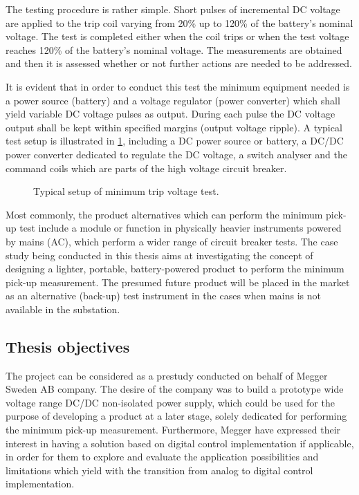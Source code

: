 The testing procedure is rather simple. Short pulses of incremental DC voltage are applied to the trip coil varying from 20\% up to 120\% of the battery's nominal voltage. The test is completed either when the coil trips or when the test voltage reaches 120\% of the battery's nominal voltage. The measurements are obtained and then it is assessed whether or not further actions are needed to be addressed. 

It is evident that in order to conduct this test the minimum equipment needed is a power source (battery) and a voltage regulator (power converter) which shall yield variable DC voltage pulses as output. During each pulse the DC voltage output shall be kept within specified margins (output voltage ripple). A typical test setup is illustrated in \cref{fig:Test_setup}, including a DC power source or battery, a DC/DC power converter dedicated to regulate the DC voltage, a switch analyser and the command coils which are parts of the high voltage circuit breaker.

\begin{figure}[h]
    \centering
    
    \caption{Typical setup of minimum trip voltage test.}
    \label{fig:Test_setup}
\end{figure}

Most commonly, the product alternatives which can perform the minimum pick-up test include a module or function in physically heavier instruments powered by mains (AC), which perform a wider range of circuit breaker tests. The case study being conducted in this thesis aims at investigating the concept of designing a lighter, portable, battery-powered product to perform the minimum pick-up measurement. The presumed future product will be placed in the market as an alternative (back-up) test instrument in the cases when mains is not available in the substation.

\subsection{Thesis objectives}

The project can be considered as a prestudy conducted on behalf of Megger Sweden AB company. The desire of the company was to build a prototype wide voltage range DC/DC non-isolated power supply, which could be used for the purpose of developing a product at a later stage, solely dedicated for performing the minimum pick-up measurement. Furthermore, Megger have expressed their interest in having a solution based on digital control implementation if applicable, in order for them to explore and evaluate the application possibilities and limitations which yield with the transition from analog to digital control implementation.

